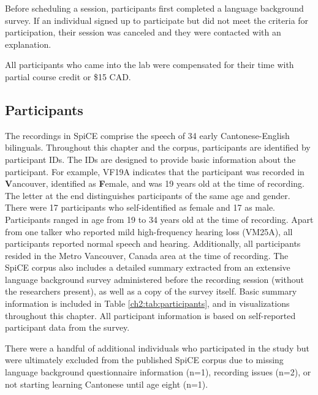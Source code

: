Before scheduling a session, participants first completed a language background survey. If an individual signed up to participate but did not meet the criteria for participation, their session was canceled and they were contacted with an explanation.

All participants who came into the lab were compensated for their time with partial course credit or \$15 CAD. 

\subsection{Participants}\label{ch2:subsec:participants} 
The recordings in SpiCE comprise the speech of 34 early Cantonese-English bilinguals. Throughout this chapter and the corpus, participants are identified by participant IDs. The IDs are designed to provide basic information about the participant. For example, VF19A indicates that the participant was recorded in \textbf{V}ancouver, identified as \textbf{F}emale, and was 19 years old at the time of recording. The letter at the end distinguishes participants of the same age and gender. There were 17 participants who self-identified as female and 17 as male. Participants ranged in age from 19 to 34 years old at the time of recording. Apart from one talker who reported mild high-frequency hearing loss (VM25A), all participants reported normal speech and hearing. Additionally, all participants resided in the Metro Vancouver, Canada area at the time of recording. The SpiCE corpus also includes a detailed summary extracted from an extensive language background survey administered before the recording session (without the researchers present), as well as a copy of the survey itself. Basic summary information is included in Table \ref{ch2:tab:participants}, and in visualizations throughout this chapter. All participant information is based on self-reported participant data from the survey.

There were a handful of additional individuals who participated in the study but were ultimately excluded from the published SpiCE corpus due to missing language background questionnaire information (n=1), recording issues (n=2), or not starting learning Cantonese until age eight (n=1).

